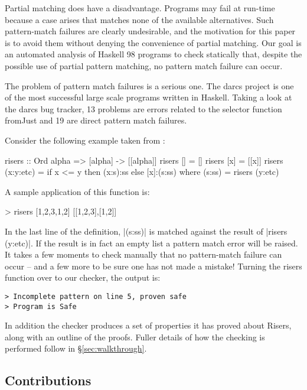 \documentclass[preprint]{sigplanconf}
\newcommand{\C}[1]{\textsf{#1}}
\begin{document}
Partial matching does have a disadvantage.  Programs may fail at run-time
because a case arises that matches none of the available alternatives.
Such pattern-match failures are clearly undesirable, and the motivation
for this paper is to avoid them without denying the convenience of
partial matching.  Our goal is an automated analysis of Haskell 98 programs
to check statically that, despite the possible use of partial pattern
matching, no pattern match failure can occur.

The problem of pattern match failures is a serious one. The darcs \citep{darcs} project is one of the most successful large scale programs written in Haskell. Taking a look at the darcs bug tracker, 13 problems are errors related to the selector function \C{fromJust} and 19 are direct pattern match failures.

Consider the following example taken from \citep{me:catch_tfp}:

\begin{code}
risers :: Ord alpha => [alpha] -> [[alpha]]
risers [] = []
risers [x] = [[x]]
risers (x:y:etc) = if x <= y then (x:s):ss else [x]:(s:ss)
    where (s:ss) = risers (y:etc)
\end{code}

A sample application of this function is:

\begin{code}
> risers [1,2,3,1,2]
[[1,2,3],[1,2]]
\end{code}

In the last line of the definition, |(s:ss)| is matched against the result of |risers (y:etc)|. If the result is in fact an empty list a pattern match error will be raised. It takes a few moments to check manually that no pattern-match failure can occur -- and a few more to be sure one has not made a mistake! Turning the \C{risers} function over to our checker, the output is:

\begin{verbatim}
> Incomplete pattern on line 5, proven safe
> Program is Safe
\end{verbatim}

In addition the checker produces a set of properties it has proved about Risers, along with an outline of the proofs. Fuller details of how the checking is performed follow in \S\ref{sec:walkthrough}.

\subsection{Contributions}
\end{document}
